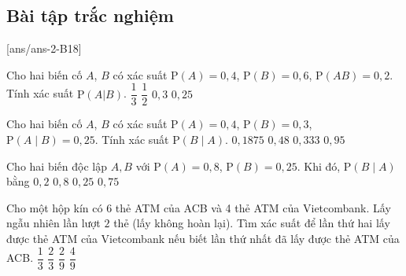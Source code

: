 \subsection{Bài tập trắc nghiệm}%
%
[ans/ans-2-B18]
\begin{ex}%
	Cho hai biến cố $A$, $B$ có xác suất $\mathrm{P}(A)=0{,}4$, $\mathrm{P}(B)=0{,}6$, $\mathrm{P}(AB)=0{,}2$. Tính xác suất $\mathrm{P}(A|B)$.
	\choice
	{\True$\dfrac{1}{3}$}
	{$\dfrac{1}{2}$}
	{$0{,}3$}
	{$0{,}25$}
\end{ex}
\begin{ex}%
	Cho hai biến cố $A$, $B$ có xác suất $\mathrm{P}(A)=0{,}4$, $\mathrm{P}(B)=0{,}3$, $\mathrm{P}(A\mid B)=0{,}25$. Tính xác suất $\mathrm{P}(B\mid A)$.
	\choice
	{\True $0{,}1875$}
	{$0{,}48$}
	{$0{,}333$}
	{$0{,}95$}
\end{ex}
\begin{ex}%
	Cho hai biến độc lập $A,B$ với $\mathrm{P}(A)=0{,}8$, $\mathrm{P}(B)=0{,}25$. Khi đó, $\mathrm{P}(B\mid A)$ bằng
	\choice
	{$0{,}2$}
	{$0{,}8$}
	{\True $0{,}25$}
	{$0{,}75$}
\end{ex}	
\begin{ex}%
	Cho một hộp kín có $6$ thẻ ATM của ACB và 4 thẻ ATM của Vietcombank. Lấy ngẫu nhiên lần lượt $2$ thẻ (lấy không hoàn lại). Tìm xác suất để lần thứ hai lấy được thẻ ATM của Vietcombank nếu biết lần thứ nhất đã lấy được thẻ ATM của ACB.
	\choice
	{ $\dfrac{1}{3}$}
	{$\dfrac{2}{3}$}
	{$\dfrac{2}{9}$}
	{\True$\dfrac{4}{9}$}
\end{ex}
